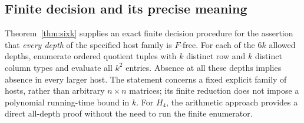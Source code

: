 \subsection{Finite decision and its precise meaning}
Theorem~\ref{thm:sixk} supplies an exact finite decision procedure
for the assertion that \emph{every depth} of the specified host family
is $F$-free. For each of the $6k$ allowed depths, enumerate ordered
quotient tuples with $k$ distinct row and $k$ distinct column types
and evaluate all $k^2$ entries. Absence at all these depths implies
absence in every larger host. The statement concerns a fixed explicit
family of hosts, rather than arbitrary $n\times n$ matrices; its
finite reduction does not impose a polynomial running-time bound in
$k$.  For $H_4$, the arithmetic approach provides a direct all-depth
proof without the need to run the finite enumerator.
